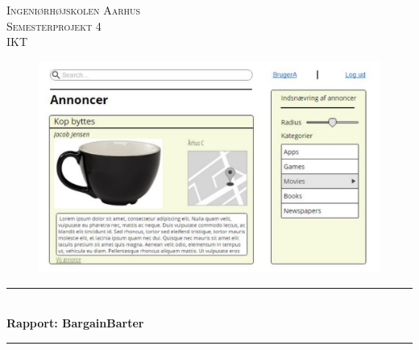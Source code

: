 \begin{titlepage}
		
		\newcommand{\HRule}{\rule{\linewidth}{0.5mm}} %
		
		\center %
		
		
		\textsc{\LARGE Ingeniørhøjskolen Aarhus}\\[1cm] %
		\textsc{\Large Semesterprojekt 4}\\[0.5cm] %
		\textsc{\large IKT}\\[0.5cm] %
		
		\begin{figure}[ht!]
			\centering
			\includegraphics[width=120mm]{figures/forside.pdf}
		\end{figure}
		
		
		\HRule \\[0.4cm]
		{ \huge \bfseries Rapport: BargainBarter}\\[0.4cm] %
		\HRule \\[1.2cm]
		
		

\end{titlepage}

